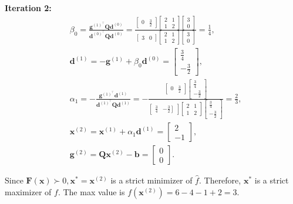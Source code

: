 \textbf{Iteration 2:}
\[
	\begin{aligned}
		& \beta_{0}=\frac{\boldsymbol{g}^{(1)^{\top}} \boldsymbol{Q} \boldsymbol{d}^{(0)}}{\boldsymbol{d}^{(0)^{\top}} \boldsymbol{Q} \boldsymbol{d}^{(0)}}=\frac{\left[\begin{array}{ll}
				0 & \frac{3}{2}
			\end{array}\right]\left[\begin{array}{ll}
				2 & 1 \\
				1 & 2
			\end{array}\right]\left[\begin{array}{l}
				3 \\
				0
			\end{array}\right]}{\left[\begin{array}{ll}
				3 & 0
			\end{array}\right]\left[\begin{array}{ll}
				2 & 1 \\
				1 & 2
			\end{array}\right]\left[\begin{array}{l}
				3 \\
				0
			\end{array}\right]}=\frac{1}{4}, \\
		& \boldsymbol{d}^{(1)}=-\boldsymbol{g}^{(1)}+\beta_{0} \boldsymbol{d}^{(0)}=\left[\begin{array}{c}
			\frac{3}{4} \\
			-\frac{3}{2}
		\end{array}\right], \\
		& \alpha_{1}=-\frac{\boldsymbol{g}^{(1)^{\top}} \boldsymbol{d}^{(1)}}{\boldsymbol{d}^{(1)^{\top}} \boldsymbol{Q} \boldsymbol{d}^{(1)}}=-\frac{\left[\begin{array}{ll}
				0 & \frac{3}{2}
			\end{array}\right]\left[\begin{array}{c}
				\frac{3}{4} \\
				-\frac{3}{2}
			\end{array}\right]}{\left[\begin{array}{ll}
				\frac{3}{4} & \left.-\frac{3}{2}\right]
			\end{array}\right]\left[\begin{array}{ll}
				2 & 1 \\
				1 & 2
			\end{array}\right]\left[\begin{array}{c}
				\frac{3}{4} \\
				-\frac{3}{2}
			\end{array}\right]}=\frac{2}{3}, \\
		& \boldsymbol{x}^{(2)}=\boldsymbol{x}^{(1)}+\alpha_{1} \boldsymbol{d}^{(1)}=\left[\begin{array}{c}
			2 \\
			-1
		\end{array}\right], \\
		& \boldsymbol{g}^{(2)}=\boldsymbol{Q} \boldsymbol{x}^{(2)}-\boldsymbol{b}=\left[\begin{array}{l}
			0 \\
			0
		\end{array}\right] .
	\end{aligned}
\]

Since \(\boldsymbol{F}(\boldsymbol{x}) \succ 0, \boldsymbol{x}^{*}=\boldsymbol{x}^{(2)}\) is a strict minimizer of \(\hat{f}\). Therefore, \(\boldsymbol{x}^{*}\) is a strict maximizer of \(f\). The max value is \(f\left(\boldsymbol{x}^{(2)}\right)=6-4-1+2=3\).
